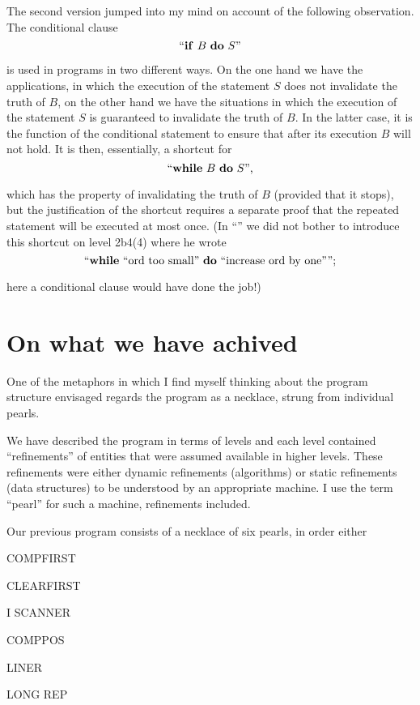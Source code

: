 The second version jumped into my mind on account of the following observation. The conditional clause
$$
\text{``\textbf{if} } B \text{ \textbf{do} } S\text{''}
$$

\noindent
is used in programs in two different ways. On the one hand we have the applications, in which the execution of the statement $S$ does not invalidate the truth of $B$, on the other hand we have the situations in which the execution of the statement $S$ is guaranteed to invalidate the truth of $B$. In the latter case, it is the function of the conditional statement to ensure that after its execution $B$ will not hold. It is then, essentially, a shortcut for
$$
\text{``\textbf{while} } B \text{ \textbf{do} } S\text{'',}
$$

\noindent
which has the property of invalidating the truth of $B$ (provided that it stops), but the justification of the shortcut requires a separate proof that the repeated statement will be executed at most once. (In ``'' we did not bother to introduce this shortcut on level 2b4(4) where he wrote
$$
\text{``\textbf{while} ``ord too small'' \textbf{do} ``increase ord by one'''';}
$$

\noindent
here a conditional clause would have done the job!)

\section{On what we have achived}

One of the metaphors in which I find myself thinking about the program structure envisaged regards the program as a necklace, strung from individual pearls.

We have described the program in terms of levels and each level contained ``refinements'' of entities that were assumed available in higher levels. These refinements were either dynamic refinements (algorithms) or static refinements (data structures) to be understood by an appropriate machine. I use the term ``pearl'' for such a machine, refinements included.

Our previous program consists of a necklace of six pearls, in order either

COMPFIRST

CLEARFIRST

I SCANNER

COMPPOS

LINER

LONG REP

